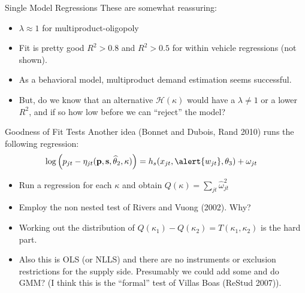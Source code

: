 \documentclass[xcolor=pdftex,dvipsnames,table,mathserif,aspectratio=169]{beamer}
\begin{document}
\begin{frame}{Single Model Regressions}
These are somewhat reassuring:
\begin{itemize}
\item $\lambda\approx 1$ for multiproduct-oligopoly
\item Fit is pretty good $R^2 > 0.8$ and $R^2 > 0.5$ for within vehicle regressions (not shown).
\item As a behavioral model, multiproduct demand estimation seems successful.
\item But, do we know that an alternative $\mathcal{H}(\kappa)$ would have a $\lambda \neq 1$ or a lower $R^2$, and if so how low before we can ``reject'' the model?
\end{itemize}
\end{frame}

\begin{frame}{Goodness of Fit Tests}
Another idea (Bonnet and Dubois, Rand 2010) runs the following regression:
\begin{align*}
\log \left( p_{jt} - \eta_{jt}(\mathbf{p},\mathbf{s},\widehat{\theta}_2,\kappa) \right) &= h_s(x_{jt}, \alert{w_{jt}},\theta_3) + \omega_{jt}
\end{align*}
\begin{itemize}
\item Run a regression for each $\kappa$ and obtain $Q(\kappa)=\sum_{jt} \widehat{\omega}_{jt}^2$
\item Employ the \alert{non nested test} of Rivers and Vuong (2002). Why?
\item Working out the distribution of $Q(\kappa_1) - Q(\kappa_2)=T(\kappa_1,\kappa_2)$ is the hard part.
\item Also this is OLS (or NLLS) and there are no instruments or \alert{exclusion restrictions} for the supply side. Presumably we could add some and do GMM? (I think this is the ``formal'' test of Villas Boas (ReStud 2007)).
\end{itemize}
\end{frame}
\end{document}

